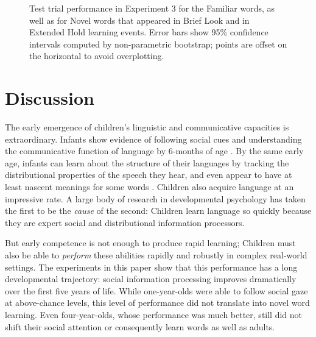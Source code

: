\documentclass{pnastwo}
\begin{document}
\begin{article}
\begin{figure}[tb]
	\caption{Test trial performance in Experiment 3 for the Familiar words, as well as for Novel words that appeared in Brief Look and in Extended Hold learning events. Error bars show 95\% confidence intervals computed by non-parametric bootstrap; points are offset on the horizontal to avoid overplotting.}
	\label{fig:soc_word_test}
\end{figure}


\section{Discussion}

The early emergence of children's linguistic and communicative capacities is extraordinary. Infants show evidence of following social cues and understanding the communicative function of language by 6-months of age \cite{senju2008, vouloumanos2014}. By the same early age, infants can learn about the structure of their languages by tracking the distributional properties of the speech they hear, and even appear to have at least nascent meanings for some words \cite{thiessen2003, bergelson2012}. Children also acquire language at an impressive rate. A large body of research in developmental psychology has taken the first to be the \emph{cause} of the second: Children learn language so quickly because they are expert social and distributional information processors.

But early competence is not enough to produce rapid learning; Children must also be able to \emph{perform} these abilities rapidly and robustly in complex real-world settings. The experiments in this paper show that this performance has a long developmental trajectory: social information processing improves dramatically over the first five years of life. While one-year-olds were able to follow social gaze at above-chance levels, this level of performance did not translate into novel word learning. Even four-year-olds, whose performance was much better, still did not shift their social attention or consequently learn words as well as adults.


\end{article}
\end{document}
